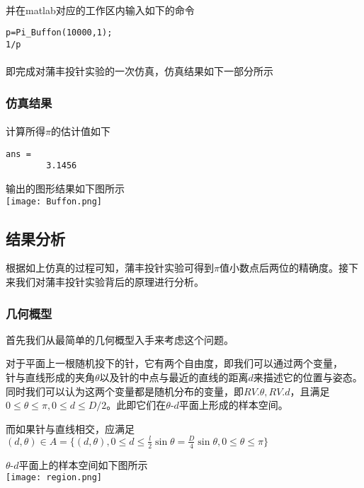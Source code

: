 \documentclass[UTF8]{ctexart}
\begin{document}
    \paragraph{}
        并在matlab对应的工作区内输入如下的命令
    \begin{lstlisting}[title=Simulation for Buffon's Needle, frame=shadowbox]
p=Pi_Buffon(10000,1);
1/p
    \end{lstlisting}
    \paragraph{}
        即完成对蒲丰投针实验的一次仿真，仿真结果如下一部分所示
        
    
    \subsubsection{仿真结果}
    \paragraph{}
    计算所得$\pi$的估计值如下
    \begin{lstlisting}[title=Result for Buffon's Needle, frame=shadowbox]
ans =
        3.1456
    \end{lstlisting}
    输出的图形结果如下图所示\\
    \texttt{[image: Buffon.png]}   



    \subsection{结果分析}
        根据如上仿真的过程可知，蒲丰投针实验可得到$\pi$值小数点后两位的精确度。接下来我们对蒲丰投针实验背后的原理进行分析。
    \subsubsection{几何概型}
        首先我们从最简单的几何概型入手来考虑这个问题。\par
        对于平面上一根随机投下的针，它有两个自由度，即我们可以通过两个变量，$\text{针与直线形成的夹角}\theta \text{以及针的中点与最近的直线的距离}d$来描述它的位置与姿态。
    同时我们可以认为这两个变量都是随机分布的变量，即$RV. \theta, RV. d$，且满足$0\leq \theta \leq \pi,0\leq d\leq D/2$。此即它们在$\theta \text{-} d$平面上形成的样本空间。\par
        而如果针与直线相交，应满足$(d,\theta)\in A=\{(d,\theta),0\leq d\leq \frac{l}{2}\sin\theta=\frac{D}{4}\sin\theta,0\leq \theta \leq \pi\}$\par
        $\theta \text{-} d$平面上的样本空间如下图所示\\
    \texttt{[image: region.png]}
        
\end{document}
